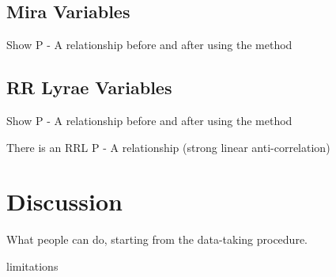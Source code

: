 \documentclass[12pt,preprint]{aastex}
\begin{document}
 \subsection{Mira Variables}
 
 Show P - A relationship before and after using the method
 
 
 
 \subsection{RR Lyrae Variables}
 
  Show P - A relationship before and after using the method

There is an RRL P - A relationship (strong linear anti-correlation)
 

\section{Discussion}
\label{sec:discussion}

What people can do, starting from the data-taking procedure.

limitations



\acknowledgements



\end{document}
